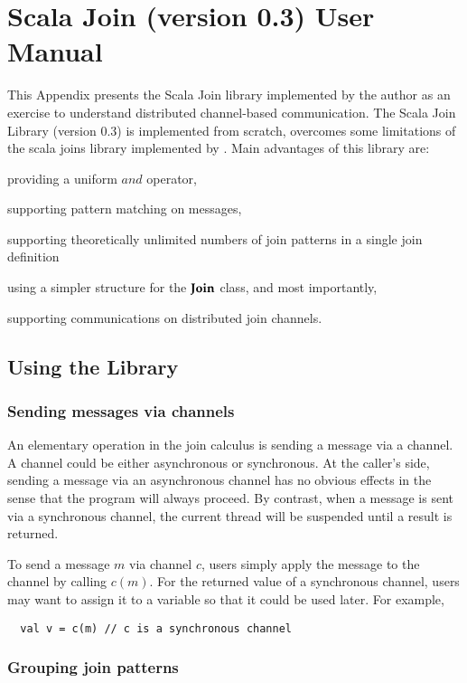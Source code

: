 \chapter{Scala Join (version 0.3) User Manual}
\label{app_lib}

This Appendix presents the Scala Join library implemented by the author as an exercise to understand distributed channel-based communication.  The Scala Join Library (version 0.3) is implemented from scratch, overcomes some limitations of
the scala joins library implemented by \citet{scala_joins}.  Main advantages of this library are: 
\begin{inparaenum}[(i)]
  \item providing a uniform $and$ operator,
  \item supporting pattern matching on messages,
  \item supporting theoretically unlimited numbers of join patterns in a single join definition
  \item using a simpler structure for the $\bf{Join}$ class, and most importantly,
  \item supporting communications on distributed join channels.
\end{inparaenum}  

\section{Using the Library}
\subsection{Sending messages via channels}
An elementary operation in the join calculus is sending a message via a channel.  A channel could be either asynchronous or synchronous.  At the caller's side, sending a message via an asynchronous channel has no obvious effects in the sense that the program will always proceed.  By contrast, when a message is sent via a synchronous channel, the current thread will be suspended until a result is returned.  

To send a message $m$ via channel $c$, users simply apply the message to the channel by calling $c(m)$.  For the returned value of a synchronous channel, users may want to assign it to a variable so that it could be used later.  For example,
\begin{lstlisting}
  val v = c(m) // c is a synchronous channel
\end{lstlisting}

\subsection{Grouping join patterns}

